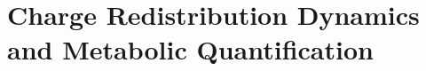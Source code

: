 
\providecommand{\Qth}{Q_{\mathrm{th}}}
\providecommand{\Qmo}{Q_{\mathrm{mo}}}
\providecommand{\Qpe}{Q_{\mathrm{pe}}}
\providecommand{\Qba}{Q_{\mathrm{ba}}}
\providecommand{\Qdr}{Q_{\mathrm{dr}}}
\providecommand{\Pbrain}{P_{\mathrm{brain}}}
\providecommand{\Pbase}{P_{\mathrm{base}}}
\providecommand{\Pcog}{P_{\mathrm{cog}}}
\providecommand{\Pperc}{P_{\mathrm{perc}}}
\providecommand{\Pth}{P_{\mathrm{th}}}
\providecommand{\Ploc}{P_{\mathrm{loc}}}
\providecommand{\Pdr}{P_{\mathrm{dr}}}
\providecommand{\Cbrain}{C_{\mathrm{brain}}}
\providecommand{\Cmotor}{C_{\mathrm{motor}}}
\providecommand{\Cperc}{C_{\mathrm{perc}}}
\providecommand{\fcard}{f_{\mathrm{card}}}
\providecommand{\taurest}{\tau_{\mathrm{rest}}}
\providecommand{\RMSSD}{\mathrm{RMSSD}}
\providecommand{\rhoeq}{\rho_{\mathrm{eq}}}
\providecommand{\Iid}{I_{\mathrm{id}}}
\providecommand{\Qcrit}{Q_{\mathrm{critical}}}

\chapter{Charge Redistribution Dynamics and Metabolic Quantification}
\label{ch:charge_quantification}


